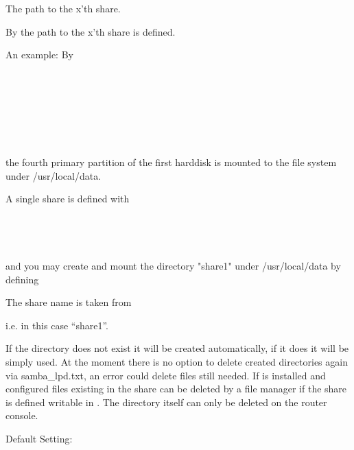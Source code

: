 \begin{description}

  The path to the x'th share.

  By  the path to the x'th share is defined.

  An example: By\\

  \\
  \\
  \\
  \\
  \\
  \\
  \\

  the fourth primary partition of the first harddisk is mounted to
  the file system under /usr/local/data.

  A single share is defined with\\

  \\
  \\
  \\
  \\

  and you may create and mount the directory "share1" under /usr/local/data by defining


  The share name is taken from


  i.e. in this case ``share1''.

  If the directory does not exist it will be created automatically, if it does
  it will be simply used. At the moment there is no option to delete created
  directories again via samba\_lpd.txt, an error could delete files still needed.
  If  is installed and configured files existing in the share can
  be deleted by a file manager if the share is defined writable in .
  The directory itself can only be deleted on the router console.

  Default Setting: 

\end{description}

